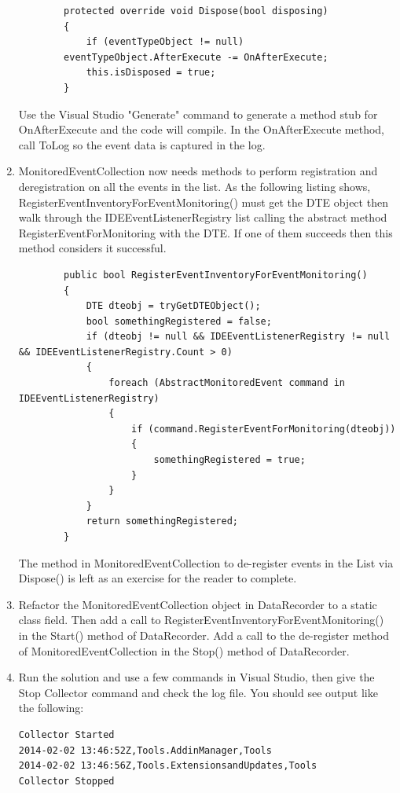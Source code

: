 \begin{enumerate}
\begin{lstlisting}
        protected override void Dispose(bool disposing)
        {
            if (eventTypeObject != null) 
		eventTypeObject.AfterExecute -= OnAfterExecute;
            this.isDisposed = true;
        }
\end{lstlisting}

Use the Visual Studio "Generate" command to generate a method stub for OnAfterExecute and the
code will compile.  In the OnAfterExecute method, call ToLog so the event data is captured in the log.

\item
MonitoredEventCollection now needs methods to perform registration and deregistration on all the events in the list.  As the following listing shows, RegisterEventInventoryForEventMonitoring() must get the DTE object then walk through the IDEEventListenerRegistry list calling the abstract method RegisterEventForMonitoring with the DTE.  If one of them succeeds then this method considers it successful.

\begin{lstlisting}
        public bool RegisterEventInventoryForEventMonitoring()
        {
            DTE dteobj = tryGetDTEObject();
            bool somethingRegistered = false;
            if (dteobj != null && IDEEventListenerRegistry != null && IDEEventListenerRegistry.Count > 0)
            {
                foreach (AbstractMonitoredEvent command in IDEEventListenerRegistry)
                {
                    if (command.RegisterEventForMonitoring(dteobj))
                    {
                        somethingRegistered = true;
                    }
                }
            }
            return somethingRegistered;
        }
\end{lstlisting}

The method in MonitoredEventCollection to de-register events in the List via Dispose() is left as an exercise for the reader to complete.

\item
Refactor the MonitoredEventCollection object in DataRecorder to a static class field.  Then add a call to RegisterEventInventoryForEventMonitoring() in the Start() method of DataRecorder.  Add a call to the de-register method of MonitoredEventCollection in the Stop() method of DataRecorder.  

\item
Run the solution and use a few commands in Visual Studio, then give the Stop Collector command and check the log file.  You should see output like the following:
\begin{verbatim}
Collector Started
2014-02-02 13:46:52Z,Tools.AddinManager,Tools
2014-02-02 13:46:56Z,Tools.ExtensionsandUpdates,Tools
Collector Stopped
\end{verbatim}


\end{enumerate}
